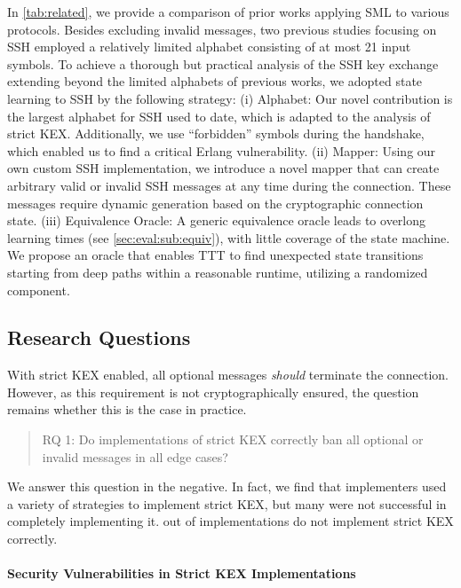 In \autoref{tab:related}, we provide a comparison of prior works applying SML to various protocols. Besides excluding invalid messages, two previous studies focusing on SSH employed a relatively limited alphabet consisting of at most 21 input symbols. To achieve a thorough but practical analysis of the SSH key exchange extending beyond the limited alphabets of previous works, we adopted state learning to SSH by the following strategy: (i) Alphabet: Our novel contribution is the largest alphabet for SSH used to date, which is adapted to the analysis of strict KEX. Additionally, we use ``forbidden'' symbols during the handshake, which enabled us to find a critical Erlang vulnerability. (ii) Mapper: Using our own custom SSH implementation, we introduce a novel mapper that can create arbitrary valid or invalid SSH messages at any time during the connection. These messages require dynamic generation based on the cryptographic connection state. (iii) Equivalence Oracle: A generic equivalence oracle leads to overlong learning times (see \autoref{sec:eval:sub:equiv}), with little coverage of the state machine. We propose an oracle that enables TTT to find unexpected state transitions starting from deep paths within a reasonable runtime, utilizing a randomized component.

\subsection{Research Questions}

With strict KEX enabled, all optional messages \emph{should} terminate the connection. However, as this requirement is not cryptographically ensured, the question remains whether this is the case in practice.

\begin{quote}
    RQ 1: Do implementations of strict KEX correctly ban all optional or invalid messages in all edge cases?
\end{quote}
We answer this question in the negative. In fact, we find that implementers used a variety of strategies to implement strict KEX, but many were not successful in completely implementing it. \nrViolatingImplementationsUpper out of \nrImplementations implementations do not implement strict KEX correctly.

\paragraph{Security Vulnerabilities in Strict KEX Implementations}

